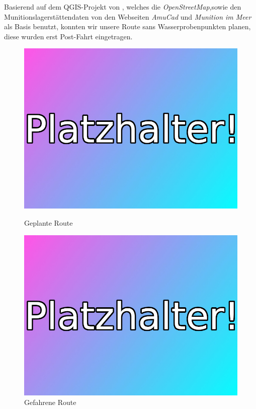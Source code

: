 Basierend auf dem QGIS-Projekt von \jens, welches die \emph{OpenStreetMap},sowie den Munitionslagerstättendaten von den Webseiten
\emph{AmuCad}\cite{amucad} und \emph{Munition im Meer}\cite{muninmeer}
als Basis benutzt, konnten wir unsere Route sans Wasserprobenpunkten planen, diese wurden erst Post-Fahrt eingetragen.
\begin{figure}[H]
    \begin{minipage}{0.48\textwidth}
        \centering
        \includegraphics[width=.9\linewidth]{Bilder/platzhalter.jpeg}
        \caption[fig:planned_route]{Geplante Route}
    \end{minipage}
    \begin{minipage}{0.48\textwidth}
        \centering
        \includegraphics[width=.9\linewidth]{Bilder/platzhalter.jpeg}
        \caption[fig:actual_route]{Gefahrene Route}
    \end{minipage}
\end{figure}
